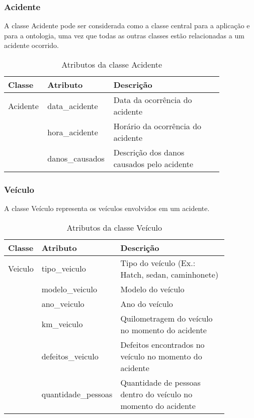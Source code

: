 \subsubsection{\textbf{Acidente}}

  A classe Acidente pode ser considerada como a classe central para a aplicação e para a ontologia,
  uma vez que todas as outras classes estão relacionadas a um acidente ocorrido.
  
    \begin{table*}[!h]
    \centering
    \begin{tabular}{p{0.15\linewidth}p{0.2\linewidth}p{0.5\linewidth}}
      \hline
      \textbf{Classe} & \textbf{Atributo} & \textbf{Descrição}\\
      \hline
	Acidente & data\_acidente & Data da ocorrência do acidente\\
		 & hora\_acidente & Horário da ocorrência do acidente\\
		 & danos\_causados & Descrição dos danos causados pelo acidente\\
      \hline
    \end{tabular}
    \caption{Atributos da classe Acidente}
    \label{tab:attr_acidente}
    \end{table*}
    
\subsubsection{\textbf{Veículo}}

  A classe Veículo representa os veículos envolvidos em um acidente.
  
    \begin{table*}[!h]
    \centering
    \begin{tabular}{p{0.15\linewidth}p{0.22\linewidth}p{0.5\linewidth}}
      \hline
      \textbf{Classe} & \textbf{Atributo} & \textbf{Descrição}\\
      \hline
	Veiculo & tipo\_veiculo & Tipo do veículo (Ex.: Hatch, sedan, caminhonete)\\
		& modelo\_veiculo & Modelo do veículo\\
		& ano\_veiculo & Ano do veículo\\		
		& km\_veiculo & Quilometragem do veículo no momento do acidente\\
		& defeitos\_veiculo & Defeitos encontrados no veículo no momento do acidente\\
		& quantidade\_pessoas & Quantidade de pessoas dentro do veículo no momento do acidente\\
      \hline
    \end{tabular}
    \caption{Atributos da classe Veículo}
    \label{tab:attr_veiculo}
    \end{table*}

